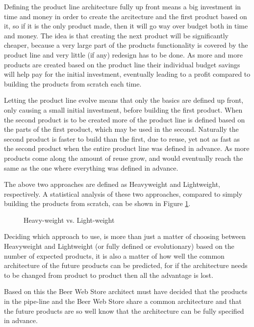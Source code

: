 Defining the product line architecture fully up front means a big investment in time and money in order to create the arcitecture and the first product based on it, so if it is the only product made, then it will go way over budget both in time and money. The idea is that creating the next product will be significantly cheaper, because a very large part of the products functionality is covered by the product line and very little (if any) redesign has to be done. As more and more products are created based on the product line their individual budget savings will help pay for the initial investment, eventually leading to a profit compared to building the products from scratch each time.

Letting the product line evolve means that only the basics are defined up front, only causing a small initial investment, before building the first product. When the second product is to be created more of the product line is defined based on the parts of the first product, which may be used in the second. Naturally the second product is faster to build than the first, due to reuse, yet not as fast as the second product when the entire product line was defined in advance. As more products come along the amount of reuse grow, and would eventually reach the same as the one where everything was defined in advance.

The above two approaches are defined as Heavyweight and Lightweight, respectively. A statistical analysis of these two approaches, compared to simply building the products from scratch, can be shown in Figure \ref{fig:product-line}.

\clearpage

\begin{figure}[!htb]
\centerline{}
\caption{Heavy-weight vs. Light-weight}
\label{fig:product-line}
\end{figure}

Deciding which approach to use, is more than just a matter of choosing between Heavyweight and Lightweight (or fully defined or evolutionary) based on the number of expected products, it is also a matter of how well the common architecture of the future products can be predicted, for if the architecture needs to be changed from product to product then all the advantage is lost.

Based on this the Beer Web Store architect must have decided that the products in the pipe-line and the Beer Web Store share a common architecture and that the future products are so well know that the architecture can be fully specified in advance.

